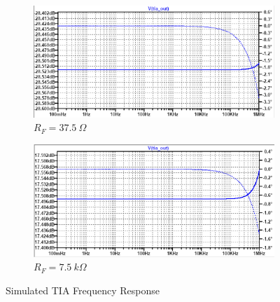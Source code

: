 \begin{figure}[H]
    \centering
    \begin{subfigure}[b]{0.48\textwidth}
        \centering
        \includegraphics[width=\textwidth]{TIA_Freq_37,5.png}
        \caption{$R_F = 37.5~\Omega$}
        \label{fig:tia_freq_37.5}
    \end{subfigure}\hfill
    \begin{subfigure}[b]{0.48\textwidth}
        \centering
        \includegraphics[width=\textwidth]{TIA_Freq_7500.png}
        \caption{$R_F = 7.5~k\Omega$}
        \label{fig:tia_freq_7.5k}
    \end{subfigure}
    \caption{Simulated TIA Frequency Response}
    \label{fig:tia_freq}
\end{figure}

